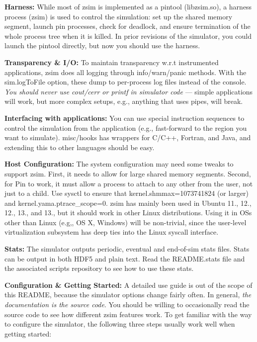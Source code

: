 {\bfseries Harness\-:} While most of zsim is implemented as a pintool ({\ttfamily libzsim.\-so}), a harness process ({\ttfamily zsim}) is used to control the simulation\-: set up the shared memory segment, launch pin processes, check for deadlock, and ensure termination of the whole process tree when it is killed. In prior revisions of the simulator, you could launch the pintool directly, but now you should use the harness.

{\bfseries Transparency \& I/\-O\-:} To maintain transparency w.\-r.\-t instrumented applications, zsim does all logging through info/warn/panic methods. With the sim.\-log\-To\-File option, these dump to per-\/process log files instead of the console. {\itshape You should never use cout/cerr or printf in simulator code} --- simple applications will work, but more complex setups, e.\-g., anything that uses pipes, will break.

{\bfseries Interfacing with applications\-:} You can use special instruction sequences to control the simulation from the application (e.\-g., fast-\/forward to the region you want to simulate). {\ttfamily misc/hooks} has wrappers for C/\-C++, Fortran, and Java, and extending this to other languages should be easy.

{\bfseries Host Configuration\-:} The system configuration may need some tweaks to support zsim. First, it needs to allow for large shared memory segments. Second, for Pin to work, it must allow a process to attach to any other from the user, not just to a child. Use sysctl to ensure that {\ttfamily kernel.\-shmmax=1073741824} (or larger) and {\ttfamily kernel.\-yama.\-ptrace\-\_\-scope=0}. zsim has mainly been used in Ubuntu 11., 12., 12., 13., and 13., but it should work in other Linux distributions. Using it in O\-Ss other than Linux (e.\-g,, O\-S X, Windows) will be non-\/trivial, since the user-\/level virtualization subsystem has deep ties into the Linux syscall interface.

{\bfseries Stats\-:} The simulator outputs periodic, eventual and end-\/of-\/sim stats files. Stats can be output in both H\-D\-F5 and plain text. Read the R\-E\-A\-D\-M\-E.\-stats file and the associated scripts repository to see how to use these stats.

{\bfseries Configuration \& Getting Started\-:} A detailed use guide is out of the scope of this R\-E\-A\-D\-M\-E, because the simulator options change fairly often. In general, {\itshape the documentation is the source code}. You should be willing to occasionally read the source code to see how different zsim features work. To get familiar with the way to configure the simulator, the following three steps usually work well when getting started\-:


